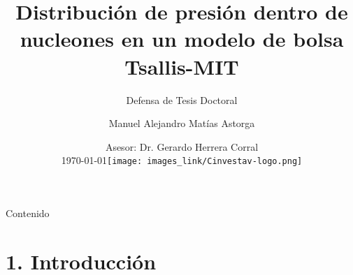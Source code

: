 \documentclass{beamer}
\title{Distribución de presión dentro de nucleones en un modelo de bolsa Tsallis-MIT}
\subtitle{Defensa de Tesis Doctoral}
\author{Manuel Alejandro Matías Astorga}
\date{
  \vspace{0.5em}
  Asesor: Dr. Gerardo Herrera Corral\\
  \today \hfill \texttt{[image: images\_link/Cinvestav-logo.png]}
}
\institute{CINVESTAV IPN}
\begin{document}
\maketitle

\begin{frame}{Contenido}
  \tableofcontents
\end{frame}

\section[Introducción]{1. Introducción}
\end{document}
